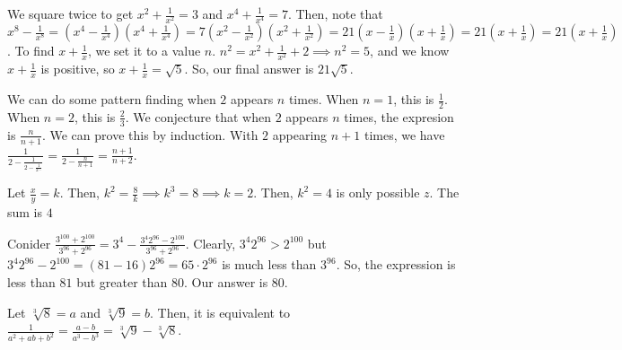 \documentclass[11pt]{article}
\begin{document}
\begin{sol} 
We square twice to get $x^2+\frac{1}{x^2}=3$ and $x^4+\frac{1}{x^4}=7$. Then, note that $x^8-\frac{1}{x^8}=(x^4-\frac{1}{x^4})(x^4+\frac{1}{x^4})=7(x^2-\frac{1}{x^2})(x^2+\frac{1}{x^2})=21(x-\frac{1}{x})(x+\frac{1}{x})=21(x+\frac{1}{x})=21(x+\frac{1}{x})$. To find $x+\frac{1}{x}$, we set it to a value $n$. $n^2 = x^2 + \frac{1}{x^2} + 2 \implies n^2 = 5$, and we know $x+\frac{1}{x}$ is positive, so $x+\frac{1}{x} = \sqrt{5}$. So, our final answer is $\boxed{21\sqrt{5}}$.
\end{sol}


\begin{sol}
We can do some pattern finding when $2$ appears $n$ times. When $n=1$, this is $\frac{1}{2}$. When $n=2$, this is $\frac{2}{3}$. We conjecture that when $2$ appears $n$ times, the expresion is $\frac{n}{n+1}$. We can prove this by induction. With $2$ appearing $n+1$ times, we have $\frac{1}{2-\frac{1}{2-\frac{1}{2\cdots}}} = \frac{1}{2-\frac{n}{n+1}}=\frac{n+1}{n+2}$.
\end{sol}


\begin{sol} 
Let $\frac{x}{y}=k$. Then, $k^2=\frac{8}{k}\implies k^3 = 8\implies k =2$. Then, $k^2=4$ is only possible $z$. The sum is $\boxed{4}$ 
\end{sol}


\begin{sol}
Conider $\frac{3^{100}+2^{100}}{3^{96}+2^{96}}=3^4-\frac{3^{4}2^{96}-2^{100}}{3^{96}+2^{96}}$. Clearly, $3^{4}2^{96}>2^{100}$ but $3^{4}2^{96}-2^{100}=(81-16)2^{96}=65\cdot 2^{96}$ is much less than $3^{96}$. So, the expression is less than $81$ but greater than $80$. Our answer is $\boxed{80}$.
\end{sol}


\begin{sol}
Let $\sqrt[3]{8}=a$ and $\sqrt[3]{9}=b$. Then, it is equivalent to $\frac{1}{a^2+ab+b^2}=\frac{a-b}{a^3-b^3}=\boxed{\sqrt[3]{9}-\sqrt[3]{8}}$.
\end{sol}
\end{document}
